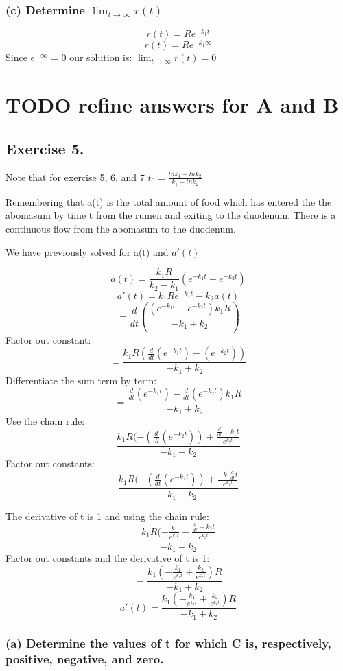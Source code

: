 \documentclass[]{article}
\begin{document}
\subsubsection{\texorpdfstring{(c) Determine
\(\lim_{t\to\infty}r(t)\)}{(c) Determine \textbackslash{}lim\_\{t\textbackslash{}to\textbackslash{}infty\}r(t)}}\label{c-determine-lim_ttoinftyrt}

\[r(t) = Re^{-k_1t}\] \[r(t) = Re^{-k_1 \infty}\] Since \(e^{-\infty}\)
= 0 our solution is: \(\lim_{t\to\infty}r(t) =0\)

\section{TODO refine answers for A and
B}\label{todo-refine-answers-for-a-and-b}

\subsection{Exercise 5.}\label{exercise-5.}

Note that for exercise 5, 6, and 7
\(t_0 = \frac{ln k_1 - ln k_2}{k_1 - lnk_2}\)

Remembering that a(t) is the total amount of food which has entered the
the abomasum by time t from the rumen and exiting to the duodenum. There
is a continuous flow from the abomasum to the duodenum.

We have previously solved for a(t) and \(a'(t)\)

\[a(t) = \frac{k_1 R}{k_2-k_1}(e^{-k_1t} - e^{-k_2t})\]
\[a'(t) = k_1Re^{-k_1t}-k_2a(t)\]
\[= \frac{d}{dt}(\frac{(e^{-k_1 t}- e^{-k_2 t})k_1 R}{-k_1 + k_2})\]
Factor out constant:
\[=\frac{k_1 R (\frac{d}{dt}(e^{-k_1 t})-(e^{-k_2 t}))}{-k_1 + k_2}\]
Differentiate the sum term by term:
\[=\frac{\frac{d}{dt}(e^{-k_1 t})- \frac{d}{dt}(e^{-k_2 t})k_1 R}{-k_1 + k_2}\]
Use the chain rule:
\[\frac{k_1 R (-(\frac{d}{dt}(e^{-k_2t}))+\frac{\frac{d}{dt}-k_1t}{e^{k_1t}}}{-k_1 +k_2}\]
Factor out constants:
\[\frac{k_1 R (-(\frac{d}{dt}(e^{-k_2t}))+\frac{-k_1\frac{d}{dt}t}{e^{k_1t}}}{-k_1 +k_2}\]

The derivative of t is 1 and using the chain rule:
\[\frac{k_1 R(-\frac{k_1}{e^{k_1 t}}-\frac{\frac{d}{dt}-k_2t}{e^{k_1t}}}{-k_1 +k_2}\]
Factor out constants and the derivative of t is 1:
\[= \frac{k_1 ( -\frac{k_1}{e^{k_1t}}+\frac{k_2}{e^{k_2t}})R}{-k_1 + k_2}\]
\[a'(t) = \frac{k_1 ( -\frac{k_1}{e^{k_1t}}+\frac{k_2}{e^{k_2t}})R}{-k_1 + k_2}\]

\subsubsection{(a) Determine the values of t for which C is,
respectively, positive, negative, and
zero.}\label{a-determine-the-values-of-t-for-which-c-is-respectively-positive-negative-and-zero.}
\end{document}
